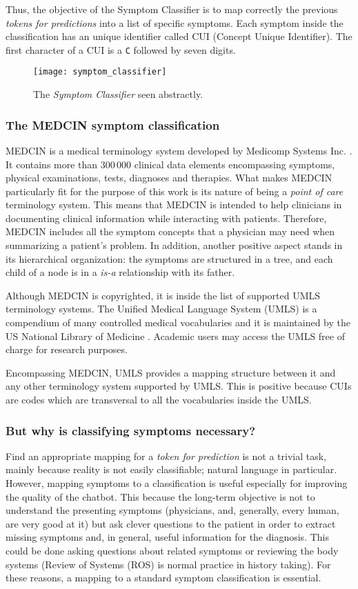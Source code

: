 Thus, the objective of the Symptom Classifier is to map correctly the previous \textit{tokens for predictions} into a list of specific symptoms. Each symptom inside the classification has an unique identifier called CUI (Concept Unique Identifier). The first character of a CUI is a \texttt{C} followed by seven digits.

\begin{figure}[h]
\centering
\texttt{[image: symptom\_classifier]}
\caption{The \textit{Symptom Classifier} seen abstractly.}
\medskip
\end{figure}

\subsubsection{The MEDCIN symptom classification}
MEDCIN is a medical terminology system developed by Medicomp Systems Inc. \cite{medcin}. It contains more than $300\,000$ clinical data elements encompassing symptoms, physical examinations, tests, diagnoses and therapies. What makes MEDCIN particularly fit for the purpose of this work is its nature of being a \textit{point of care} terminology system. This means that MEDCIN is intended to help clinicians in documenting clinical information while interacting with patients. Therefore, MEDCIN includes all the symptom concepts that a physician may need when summarizing a patient's problem. In addition, another positive aspect stands in its hierarchical organization: the symptoms are structured in a tree, and each child of a node is in a \textit{is-a} relationship with its father.

Although MEDCIN is copyrighted, it is inside the list of supported UMLS terminology systems. The Unified Medical Language System (UMLS) is a compendium of many controlled medical vocabularies and it is maintained by the US National Library of Medicine \cite{umls}. Academic users may access the UMLS free of charge for research purposes.

Encompassing MEDCIN, UMLS provides a mapping structure between it and any other terminology system supported by UMLS. This is positive because CUIs are codes which are transversal to all the vocabularies inside the UMLS.

\subsubsection{But why is  classifying symptoms necessary?}
Find an appropriate mapping for a \textit{token for prediction} is not a trivial task, mainly because reality is not easily classifiable; natural language in particular. However, mapping symptoms to a classification is useful especially for improving the quality of the chatbot. This because the long-term objective is not to understand the presenting symptoms (physicians, and, generally, every human, are very good at it) but ask clever questions to the patient in order to extract missing symptoms and, in general, useful information for the diagnosis. This could be done asking questions about related symptoms or reviewing the body systems (Review of Systems (ROS) is normal practice in history taking). For these reasons, a mapping to a standard symptom classification is essential.

